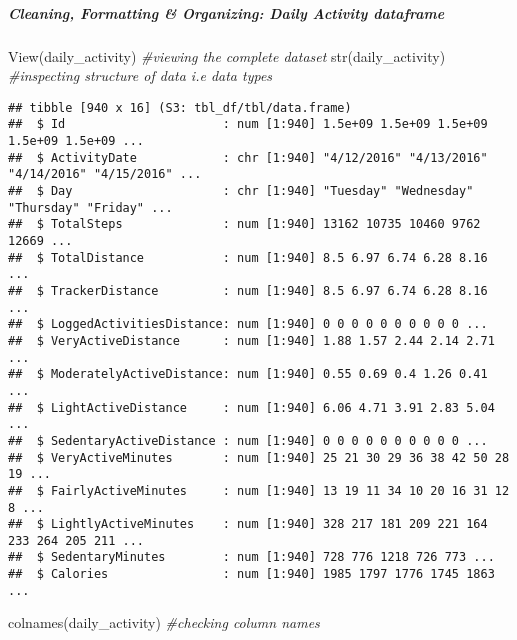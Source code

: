 \documentclass[
]{article}
\newenvironment{Shaded}{\begin{snugshade}}{\end{snugshade}}
\newcommand{\CommentTok}[1]{\textcolor[rgb]{0.56,0.35,0.01}{\textit{#1}}}
\newcommand{\FunctionTok}[1]{\textcolor[rgb]{0.00,0.00,0.00}{#1}}
\newcommand{\NormalTok}[1]{#1}
\begin{document}
\hypertarget{cleaning-formatting-organizing-daily-activity-dataframe}{%
\subparagraph{\texorpdfstring{\textbf{Cleaning, Formatting \&
Organizing: Daily Activity
dataframe}}{Cleaning, Formatting \& Organizing: Daily Activity dataframe}}\label{cleaning-formatting-organizing-daily-activity-dataframe}}

\begin{Shaded}
\begin{Highlighting}[]
 \FunctionTok{View}\NormalTok{(daily\_activity) }\CommentTok{\#viewing the complete dataset}
 \FunctionTok{str}\NormalTok{(daily\_activity) }\CommentTok{\#inspecting structure of data i.e data types}
\end{Highlighting}
\end{Shaded}

\begin{verbatim}
## tibble [940 x 16] (S3: tbl_df/tbl/data.frame)
##  $ Id                      : num [1:940] 1.5e+09 1.5e+09 1.5e+09 1.5e+09 1.5e+09 ...
##  $ ActivityDate            : chr [1:940] "4/12/2016" "4/13/2016" "4/14/2016" "4/15/2016" ...
##  $ Day                     : chr [1:940] "Tuesday" "Wednesday" "Thursday" "Friday" ...
##  $ TotalSteps              : num [1:940] 13162 10735 10460 9762 12669 ...
##  $ TotalDistance           : num [1:940] 8.5 6.97 6.74 6.28 8.16 ...
##  $ TrackerDistance         : num [1:940] 8.5 6.97 6.74 6.28 8.16 ...
##  $ LoggedActivitiesDistance: num [1:940] 0 0 0 0 0 0 0 0 0 0 ...
##  $ VeryActiveDistance      : num [1:940] 1.88 1.57 2.44 2.14 2.71 ...
##  $ ModeratelyActiveDistance: num [1:940] 0.55 0.69 0.4 1.26 0.41 ...
##  $ LightActiveDistance     : num [1:940] 6.06 4.71 3.91 2.83 5.04 ...
##  $ SedentaryActiveDistance : num [1:940] 0 0 0 0 0 0 0 0 0 0 ...
##  $ VeryActiveMinutes       : num [1:940] 25 21 30 29 36 38 42 50 28 19 ...
##  $ FairlyActiveMinutes     : num [1:940] 13 19 11 34 10 20 16 31 12 8 ...
##  $ LightlyActiveMinutes    : num [1:940] 328 217 181 209 221 164 233 264 205 211 ...
##  $ SedentaryMinutes        : num [1:940] 728 776 1218 726 773 ...
##  $ Calories                : num [1:940] 1985 1797 1776 1745 1863 ...
\end{verbatim}

\begin{Shaded}
\begin{Highlighting}[]
 \FunctionTok{colnames}\NormalTok{(daily\_activity)  }\CommentTok{\#checking column names}
\end{Highlighting}
\end{Shaded}
\end{document}
